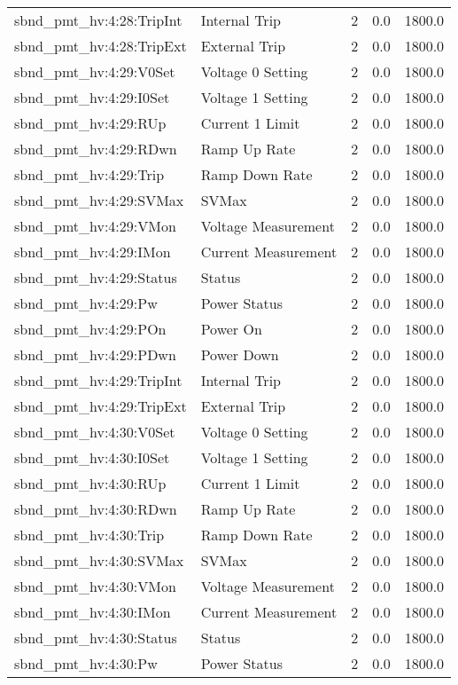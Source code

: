 \begin{center}
\begin{longtable}{l | l l l l }
sbnd\_pmt\_hv:4:28:TripInt & Internal Trip & 2 & 0.0 & 1800.0\\ 
sbnd\_pmt\_hv:4:28:TripExt & External Trip & 2 & 0.0 & 1800.0\\ 
sbnd\_pmt\_hv:4:29:V0Set & Voltage 0 Setting & 2 & 0.0 & 1800.0\\ 
sbnd\_pmt\_hv:4:29:I0Set & Voltage 1 Setting & 2 & 0.0 & 1800.0\\ 
sbnd\_pmt\_hv:4:29:RUp & Current 1 Limit & 2 & 0.0 & 1800.0\\ 
sbnd\_pmt\_hv:4:29:RDwn & Ramp Up Rate & 2 & 0.0 & 1800.0\\ 
sbnd\_pmt\_hv:4:29:Trip & Ramp Down Rate & 2 & 0.0 & 1800.0\\ 
sbnd\_pmt\_hv:4:29:SVMax & SVMax & 2 & 0.0 & 1800.0\\ 
sbnd\_pmt\_hv:4:29:VMon & Voltage Measurement & 2 & 0.0 & 1800.0\\ 
sbnd\_pmt\_hv:4:29:IMon & Current Measurement & 2 & 0.0 & 1800.0\\ 
sbnd\_pmt\_hv:4:29:Status & Status & 2 & 0.0 & 1800.0\\ 
sbnd\_pmt\_hv:4:29:Pw & Power Status & 2 & 0.0 & 1800.0\\ 
sbnd\_pmt\_hv:4:29:POn & Power On & 2 & 0.0 & 1800.0\\ 
sbnd\_pmt\_hv:4:29:PDwn & Power Down & 2 & 0.0 & 1800.0\\ 
sbnd\_pmt\_hv:4:29:TripInt & Internal Trip & 2 & 0.0 & 1800.0\\ 
sbnd\_pmt\_hv:4:29:TripExt & External Trip & 2 & 0.0 & 1800.0\\ 
sbnd\_pmt\_hv:4:30:V0Set & Voltage 0 Setting & 2 & 0.0 & 1800.0\\ 
sbnd\_pmt\_hv:4:30:I0Set & Voltage 1 Setting & 2 & 0.0 & 1800.0\\ 
sbnd\_pmt\_hv:4:30:RUp & Current 1 Limit & 2 & 0.0 & 1800.0\\ 
sbnd\_pmt\_hv:4:30:RDwn & Ramp Up Rate & 2 & 0.0 & 1800.0\\ 
sbnd\_pmt\_hv:4:30:Trip & Ramp Down Rate & 2 & 0.0 & 1800.0\\ 
sbnd\_pmt\_hv:4:30:SVMax & SVMax & 2 & 0.0 & 1800.0\\ 
sbnd\_pmt\_hv:4:30:VMon & Voltage Measurement & 2 & 0.0 & 1800.0\\ 
sbnd\_pmt\_hv:4:30:IMon & Current Measurement & 2 & 0.0 & 1800.0\\ 
sbnd\_pmt\_hv:4:30:Status & Status & 2 & 0.0 & 1800.0\\ 
sbnd\_pmt\_hv:4:30:Pw & Power Status & 2 & 0.0 & 1800.0\\ 

\end{longtable}
\end{center}
